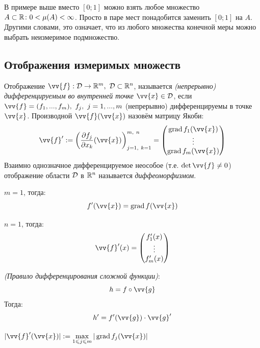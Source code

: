 \begin{note}
	В примере выше вместо $[0; 1]$ можно взять любое множество $A \subset \mathbb{R} \colon 0 < \mu(A) < \infty$. Просто в паре мест понадобится заменить $[0; 1]$ на $A$. Другими словами, это означает, что из любого множества конечной меры можно выбрать неизмеримое подмножество.
\end{note}

\subsection{Отображения измеримых множеств}

\begin{definition}
	Отображение $\vv{f}: \D\to \R^m,\ \D\subset\R^n$, называется \textit{(непрерывно) дифференцируемым во внутренней точке} $\vv{x}\in \D$, если $\vv{f} = (f_1,...,f_m),\ f_j,\ j=1,...,m$ (непрерывно) дифференцируемы в точке $\vv{x}$. Производной $\vv{f}(\vv{x})$ назовём матрицу Якоби:
	\[
		\vv{f}':= \left(\pd{f_j}{x_k}(\vv{x}) \right)^{m,\  n}_{j=1,\ k=1} = \begin{pmatrix}
			\grad{f_1(\vv{x})}\\
			\vdots\\
			\grad{f_m(\vv{x})}
		\end{pmatrix}
	\]
	Взаимно однозначное дифференцируемое неособое (т.е. $\det{\vv{f}\neq 0}$) отображение области $\mathcal{D}$ в $\mathbb{R}^n$ называется \textit{диффеоморфизмом}.
\end{definition}


\begin{example}
	$m=1$, тогда: 
	\[
	f'(\vv{x}) = \grad{f(\vv{x})}
	\]
\end{example}

\begin{example}
	$n=1$, тогда: 
	\[
		\vv{f}'(x) = \begin{pmatrix}
			f_1'(x)\\
			\vdots\\
			f_m'(x)
		\end{pmatrix}
	\]
\end{example}

\begin{example}
	\textit{(Правило дифференцирования сложной функции)}:
	\[
		h = f \circ \vv{g}
	\]
	Тогда:
	\[
		h'= f'(\vv{g})\cdot \vv{g}'
	\]
\end{example}

\begin{notation}
	$|\vv{f}'(\vv{x})|:=\max\limits_{1\le j\le m}{|\grad{f_j(\vv{x})}|}$
\end{notation}

